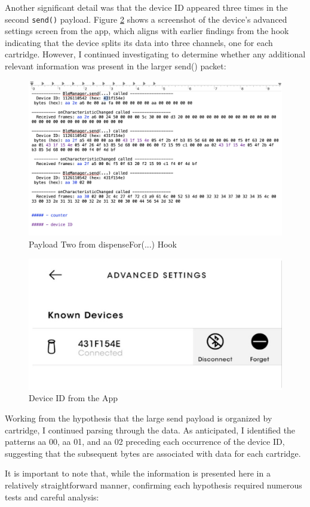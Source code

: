 Another significant detail was that the device ID appeared three times in the second \texttt{send()} payload. Figure \ref{fig:deviceid} shows a screenshot of the device’s advanced settings screen from the app, which aligns with earlier findings from the hook indicating that the device splits its data into three channels, one for each cartridge. However, I continued investigating to determine whether any additional relevant information was present in the larger send() packet:

\begin{figure}[H]
	\centering
	\includegraphics[width=0.7\linewidth]{payload2}
	\caption{Payload Two from dispenseFor(...) Hook}
	\label{fig:payload2}
\end{figure}

\begin{figure}[H]
	\centering
	\includegraphics[width=0.7\linewidth]{device_id}
	\caption{Device ID from the App}
	\label{fig:deviceid}
\end{figure}

Working from the hypothesis that the large send payload is organized by cartridge, I continued parsing through the data. As anticipated, I identified the patterns aa 00, aa 01, and aa 02 preceding each occurrence of the device ID, suggesting that the subsequent bytes are associated with data for each cartridge.

It is important to note that, while the information is presented here in a relatively straightforward manner, confirming each hypothesis required numerous tests and careful analysis:

